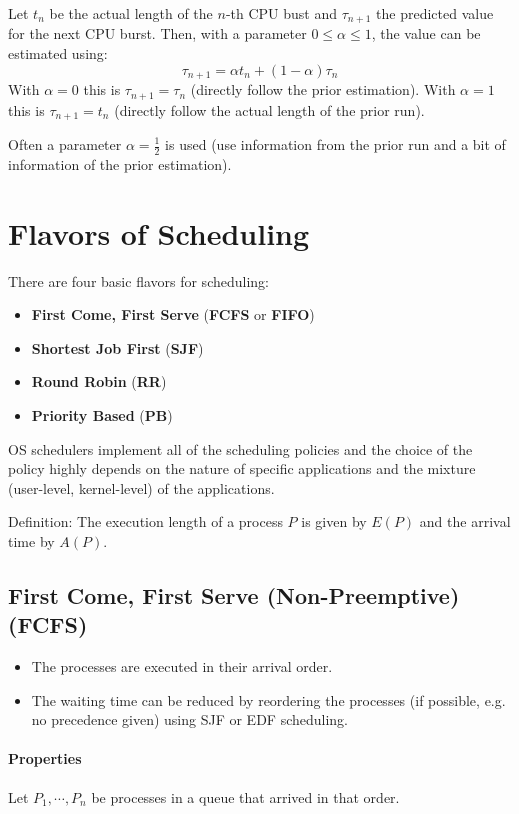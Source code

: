 	Let \( t_n \) be the actual length of the \(n\)-th CPU bust and \( \tau_{n+1} \) the predicted value for the next CPU burst. Then, with a parameter \( 0 \leq \alpha \leq 1 \), the value can be estimated using:
	\begin{equation*}
		\tau _ {n + 1} = \alpha t_n + (1 - \alpha) \tau_n
	\end{equation*}
	With \( \alpha = 0 \) this is \( \tau_{n+1}=\tau_n \) (directly follow the prior estimation). With \( \alpha = 1 \) this is \( \tau_{n+1} = t_n \) (directly follow the actual length of the prior run).

	Often a parameter \(\alpha = \frac{1}{2}\) is used (use information from the prior run and a bit of information of the prior estimation).

\section{Flavors of Scheduling}
There are four basic flavors for scheduling:
\begin{itemize}
	\item \textbf{First Come, First Serve} (\textbf{FCFS} or \textbf{FIFO})
	\item \textbf{Shortest Job First} (\textbf{SJF})
	\item \textbf{Round Robin} (\textbf{RR})
	\item \textbf{Priority Based} (\textbf{PB})
\end{itemize}
OS schedulers implement all of the scheduling policies and the choice of the policy highly depends on the nature of specific applications and the mixture (user-level, kernel-level) of the applications.

Definition: The execution length of a process \(P\) is given by \( E(P) \) and the arrival time by \( A(P) \).

\subsection{First Come, First Serve (Non-Preemptive) (FCFS)} %
\begin{itemize}
	\item The processes are executed in their arrival order.
	\item The waiting time can be reduced by reordering the processes (if possible, e.g. no precedence given) using SJF or EDF scheduling.
\end{itemize}

\paragraph{Properties}
Let \( P_1, \cdots, P_n \) be processes in a queue that arrived in that order.

